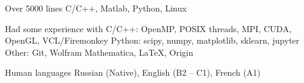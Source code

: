 

\begin{cvskills}

  \cvskill
    {Over 5000 lines} %
    {C/C++, Matlab, Python, Linux} %

  \cvskill
    {Had some experience with} %
    {\newline C/C++: OpenMP, POSIX threads, MPI, CUDA, OpenGL, VCL/Firemonkey \newline Python: scipy, numpy, matplotlib, sklearn, jupyter \newline Other: Git, Wolfram Mathematica, \LaTeX, Origin \newline} %

  \cvskill
    {Human languages} %
    {Russian (Native), English (B2 -- C1), French (A1)} %

\end{cvskills}
